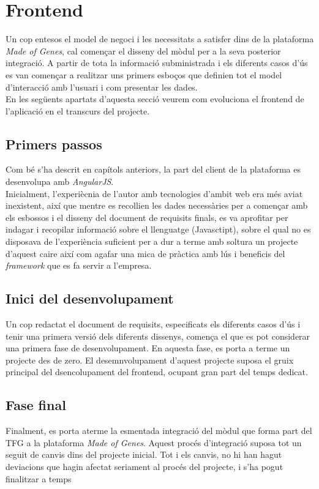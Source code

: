 \section{Frontend}
Un cop entesos el model de negoci i les necessitats a satisfer dins de la plataforma \textit{Made of Genes}, cal començar el disseny del mòdul  per a la seva posterior integració. A partir de tota la informació subministrada i els diferents casos d'ús es van començar a realitzar uns primers esboços que definien tot el model d'interacció amb l'usuari i com presentar les dades.\\
\newline En les següents apartats d'aquesta secció veurem com evoluciona el frontend de l'aplicació en el transcurs del projecte.
\subsection{Primers passos}
Com bé s'ha descrit en capítols anteriors, la part del client de la plataforma es desenvolupa amb \textit{AngularJS}.\\
Inicialment, l'experiècnia de l'autor amb tecnologies d'ambit web era més aviat inexistent, així que mentre es recollien les dades necessàries per a començar amb els esbossos i el disseny del document de requisits finals, es va aprofitar per indagar i recopilar informació sobre el llenguatge (Javasctipt), sobre el qual no es disposava de l'experiència suficient per a dur a terme amb soltura un projecte d'aquest caire així com agafar una mica de pràctica amb lús i beneficis del \textit{framework} que es fa servir a l'empresa.
\subsection{Inici del desenvolupament}
Un cop redactat el document de requisits, especificats els diferents casos d'ús i tenir una primera versió dels diferents dissenys, comença el que es pot considerar una primera fase de desenvolupament.
\newline En aquesta fase, es porta a terme un projecte des de zero.
\newline El desemnvolupament d'aquest projecte suposa el gruix principal del dsencolupament del frontend, ocupant gran part del temps dedicat.
\subsection{Fase final}
Finalment, es porta aterme la esmentada integració del mòdul que forma part del TFG a la plataforma \textit{Made of Genes}.
\newline Aquest procés d'integració suposa tot un seguit de canvis dins del projecte inicial.
\newline Tot i els canvis, no hi han hagut deviacions que hagin afectat seriament al procés del projecte, i s'ha pogut finalitzar a temps

